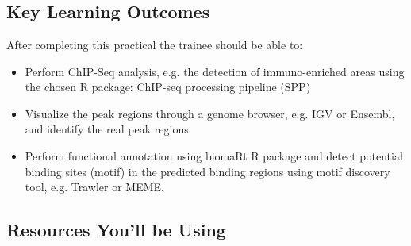 
\chapter{\moduleTitle}
\newpage

\section{Key Learning Outcomes}

After completing this practical the trainee should be able to:
\begin{itemize}
  \item Perform ChIP-Seq analysis, e.g. the detection of immuno-enriched areas using the chosen R package: ChIP-seq processing pipeline (SPP) 
  \item Visualize the peak regions through a genome browser, e.g. IGV or Ensembl, and identify the real peak regions
  \item Perform functional annotation using biomaRt R package and detect potential binding sites (motif) in the predicted binding regions using motif discovery tool, e.g. Trawler or MEME.
\end{itemize}

\section{Resources You'll be Using}
 
